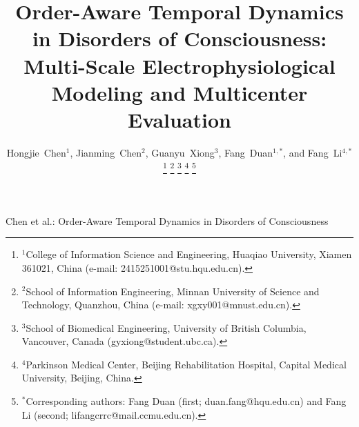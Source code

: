 \documentclass[journal,twoside,web]{ieeecolor}
\begin{document}
\pagestyle{plain}


\title{Order-Aware Temporal Dynamics in Disorders of Consciousness: Multi-Scale Electrophysiological Modeling and Multicenter Evaluation}

\author{\parbox{\textwidth}{\centering\fontsize{9pt}{11pt}\selectfont Hongjie~Chen$^{1}$, Jianming~Chen$^{2}$, Guanyu~Xiong$^{3}$, Fang~Duan$^{1,*}$, and Fang~Li$^{4,*}$}%
\thanks{$^{1}$College of Information Science and Engineering, Huaqiao University, Xiamen 361021, China (e-mail: 2415251001@stu.hqu.edu.cn).}%
\thanks{$^{2}$School of Information Engineering, Minnan University of Science and Technology, Quanzhou, China (e-mail: xgxy001@mnust.edu.cn).}%
\thanks{$^{3}$School of Biomedical Engineering, University of British Columbia, Vancouver, Canada (gyxiong@student.ubc.ca).}%
\thanks{$^{4}$Parkinson Medical Center, Beijing Rehabilitation Hospital, Capital Medical University, Beijing, China.}%
\thanks{$^{*}$Corresponding authors: Fang Duan (first; duan.fang@hqu.edu.cn) and Fang Li (second; lifangcrrc@mail.ccmu.edu.cn).}%
}

%
{Chen et al.: Order-Aware Temporal Dynamics in Disorders of Consciousness}

\maketitle
\end{document}
